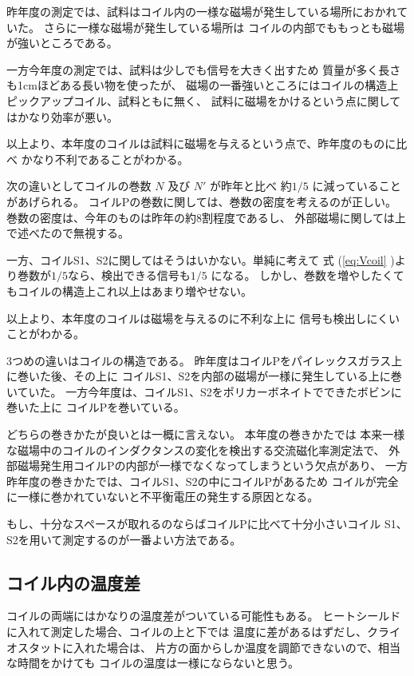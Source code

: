 昨年度の測定では、試料はコイル内の一様な磁場が発生している場所におかれていた。
さらに一様な磁場が発生している場所は
コイルの内部でももっとも磁場が強いところである。

一方今年度の測定では、試料は少しでも信号を大きく出すため
質量が多く長さも1cmほどある長い物を使ったが、
磁場の一番強いところにはコイルの構造上ピックアップコイル、試料ともに無く、
試料に磁場をかけるという点に関してはかなり効率が悪い。

以上より、本年度のコイルは試料に磁場を与えるという点で、昨年度のものに比べ
かなり不利であることがわかる。

\bigskip

次の違いとしてコイルの巻数 $N$ 及び $N'$ が昨年と比べ
約$1/5$ に減っていることがあげられる。
コイルPの巻数に関しては、巻数の密度を考えるのが正しい。
巻数の密度は、今年のものは昨年の約8割程度であるし、
外部磁場に関しては上で述べたので無視する。

一方、コイルS1、S2に関してはそうはいかない。単純に考えて
式 (\ref{eq:Vcoil} )より巻数が$1/5$なら、検出できる信号も$1/5$ になる。
しかし、巻数を増やしたくてもコイルの構造上これ以上はあまり増やせない。


以上より、本年度のコイルは磁場を与えるのに不利な上に
信号も検出しにくいことがわかる。

\bigskip

3つめの違いはコイルの構造である。
昨年度はコイルPをパイレックスガラス上に巻いた後、その上に
コイルS1、S2を内部の磁場が一様に発生している上に巻いていた。
一方今年度は、コイルS1、S2をポリカーボネイトでできたボビンに巻いた上に
コイルPを巻いている。

どちらの巻きかたが良いとは一概に言えない。
本年度の巻きかたでは
本来一様な磁場中のコイルのインダクタンスの変化を検出する交流磁化率測定法で、
外部磁場発生用コイルPの内部が一様でなくなってしまうという欠点があり、
一方昨年度の巻きかたでは、コイルS1、S2の中にコイルPがあるため
コイルが完全に一様に巻かれていないと不平衡電圧の発生する原因となる。

もし、十分なスペースが取れるのならばコイルPに比べて十分小さいコイル
S1、S2を用いて測定するのが一番よい方法である。

\subsection{コイル内の温度差}\label{subsec:コイル温度}

コイルの両端にはかなりの温度差がついている可能性もある。
ヒートシールドに入れて測定した場合、コイルの上と下では
温度に差があるはずだし、クライオスタットに入れた場合は、
片方の面からしか温度を調節できないので、相当な時間をかけても
コイルの温度は一様にならないと思う。

